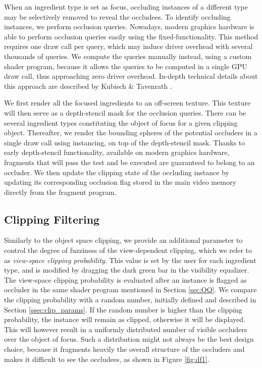 When an ingredient type is set as focus, occluding instances of a different type may be selectively removed to reveal the occludees.
To identify occluding instances, we perform occlusion queries. 
Nowadays, modern graphics hardware is able to perform occlusion queries easily using the fixed-functionality.
This method requires one draw call per query, which may induce driver overhead with several thousands of queries.
We compute the queries manually instead, using a custom shader program, because it allows the queries to be computed in a single GPU draw call, thus approaching zero driver overhead.
In-depth technical details about this approach are described by Kubisch \& Tavenrath \cite{kubisch2014opengl}.

We first render all the focused ingredients to an off-screen texture. 
This texture will then serve as a depth-stencil mask for the occlusion queries.
There can be several ingredient types constituting the object of focus for a given clipping object.
Thereafter, we render the bounding spheres of the potential occluders in a single draw call using instancing, on top of the depth-stencil mask.
Thanks to early depth-stencil functionality, available on modern graphics hardware, fragments that will pass the test and be executed are guaranteed to belong to an occluder.
We then update the clipping state of the occluding instance by updating its corresponding occlusion flag stored in the main video memory directly from the fragment program.


\vspace{-2mm}
\subsection{Clipping Filtering}

Similarly to the object space clipping, we provide an additional parameter to control the degree of fuzziness of the view-dependent clipping, which we refer to as \emph{view-space clipping probability}.
This value is set by the user for each ingredient type, and is modified by dragging the dark green bar in the visibility equalizer.
The view-space clipping probability is evaluated after an instance is flagged as occluder in the same shader program mentioned in Section \ref{sec:OQ}.
We compare the clipping probability with a random number, initially defined and described in Section \ref{ssec:clip_params}.
If the random number is higher than the clipping probability, the instance will remain as clipped, otherwise it will be displayed. 
This will however result in a uniformly distributed number of visible occluders over the object of focus. 
Such a distribution might not always be the best design choice, because it fragments heavily the overall structure of the occluders and makes it difficult to see the occludees, as shown in Figure \ref{fig:df1}.

